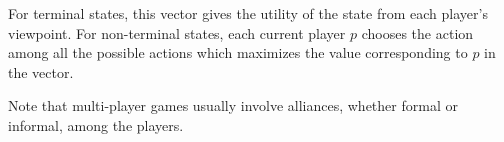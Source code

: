 \documentclass[12pt, a4paper]{report}
\begin{document}
For terminal states, this vector gives the utility of the state from each player’s viewpoint. 
For non-terminal states, each current player $p$ chooses the action among all the possible actions which maximizes the value corresponding to $p$ in the vector. 

Note that multi-player games usually involve alliances, whether formal or informal, among the players. 
\end{document}
